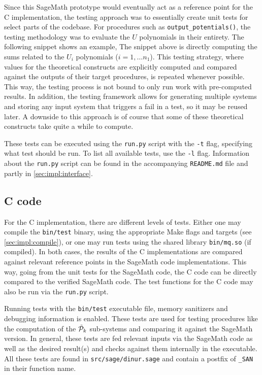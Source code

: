Since this SageMath prototype would eventually act as a reference point for the C implementation, the testing approach was to essentially create unit tests for select parts of the codebase. For procedures such as \texttt{output\_potentials()}, the testing methodology was to evaluate the $U$ polynomials in their entirety. The following snippet shows an example,
The snippet above is directly computing the sums related to the $U_i$ polynomials ($i = 1, \dots n_1$). This testing strategy, where values for the theoretical constructs are explicitly computed and compared against the outputs of their target procedures, is repeated whenever possible. This way, the testing process is not bound to only run work with pre-computed results. In addition, the testing framework allows for generating multiple systems and storing any input system that triggers a fail in a test, so it may be reused later. A downside to this approach is of course that some of these theoretical constructs take quite a while to compute.

These tests can be executed using the \texttt{run.py} script with the \texttt{-t} flag, specifying what test should be run. To list all available tests, use the \texttt{-l} flag. Information about the \texttt{run.py} script can be found in the accompanying \texttt{README.md} file and partly in \cref{sec:impl:interface}.

\subsection{C code}

For the C implementation, there are different levels of tests. Either one may compile the \texttt{bin/test} binary, using the appropriate Make flags and targets (see \cref{sec:impl:compile}), or one may run tests using the shared library \texttt{bin/mq.so} (if compiled). In both cases, the results of the C implementations are compared against relevant reference points in the SageMath code implementations. This way, going from the unit tests for the SageMath code, the C code can be directly compared to the verified SageMath code. The test functions for the C code may also be run via the \texttt{run.py} script.

Running tests with the \texttt{bin/test} executable file, memory sanitizers and debugging information is enabled. These tests are used for testing procedures like the computation of the $\Tilde{\mathcal{P}}_k$ sub-systems and comparing it against the SageMath version. In general, these tests are fed relevant inputs via the SageMath code as well as the desired result(s) and checks against them internally in the executable. All these tests are found in \texttt{src/sage/dinur.sage} and contain a postfix of \texttt{\_SAN} in their function name.

